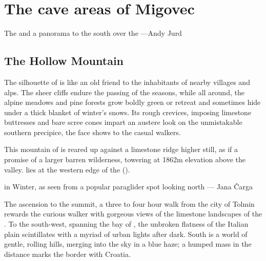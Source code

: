 \chapter{The cave areas of Migovec}
\begin{marginfigure}
\checkoddpage \ifoddpage \forcerectofloat \else \forceversofloat \fi
\centering
\vspace{50pt}
 \caption{The \protect{} and a panorama to the south over the \protect{} ---Andy Jurd}
 \label{dinarides}
\end{marginfigure}

\section{The Hollow Mountain}
The silhouette of  is like an old friend to the inhabitants of nearby villages and alps. The sheer cliffs endure the passing of the seasons, while all around, the alpine meadows and pine forests grow boldly green or retreat and sometimes hide under a thick blanket of winter's snows. Its rough crevices, imposing limestone buttresses and bare scree cones impart an austere look on the unmistakable southern precipice, the face  shows to the casual walkers.

This mountain of  is reared up against a limestone ridge higher still, as if a promise of a larger barren wilderness, towering at 1862m elevation above the  valley.  lies at the western edge of the  (). 


 \begin{pagefigure}
 \checkoddpage \ifoddpage \forcerectofloat \else \forceversofloat \fi
\centering
  \label{winter panorama migovec}
  \caption{\protect{} in Winter, as seen from a popular paraglider spot looking north --- Jana Čarga}
 \end{pagefigure}

The ascension to the summit, a three to four hour walk from the city of Tolmin rewards the curious walker with gorgeous views of the limestone landscapes of the . To the south-west, spanning the bay of , the unbroken flatness of the Italian plain scintillates with a myriad of urban lights after dark. South is a world of gentle, rolling hills, merging into the sky in a blue haze; a humped mass in the distance marks the border with Croatia. 

